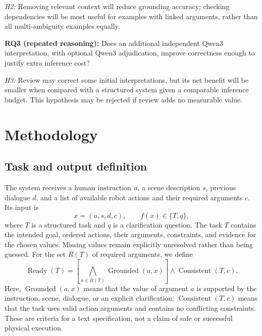 \documentclass[10pt,conference]{IEEEtran}
\begin{document}
\emph{H2:} Removing relevant context will reduce grounding accuracy; checking dependencies will be most useful for examples with linked arguments, rather than all multi-ambiguity examples equally.

\textbf{RQ3 (repeated reasoning):} Does an additional independent Qwen3 interpretation, with optional Qwen3 adjudication, improve correctness enough to justify extra inference cost?

\emph{H3:} Review may correct some initial interpretations, but its net benefit will be smaller when compared with a structured system given a comparable inference budget. This hypothesis may be rejected if review adds no measurable value.

\section{Methodology}
\subsection{Task and output definition}
The system receives a human instruction $u$, a scene description $s$, previous dialogue $d$, and a list of available robot actions and their required arguments $c$. Its input is
\begin{equation}
 x=(u,s,d,c),\qquad f(x)\in\{T,q\},
 \label{eq:task}
\end{equation}
where $T$ is a structured task and $q$ is a clarification question. The task $T$ contains the intended goal, ordered actions, their arguments, constraints, and evidence for the chosen values. Missing values remain explicitly unresolved rather than being guessed. For the set $R(T)$ of required arguments, we define
\begin{equation}
 \operatorname{Ready}(T)=
 \left[\bigwedge_{a\in R(T)}\operatorname{Grounded}(a,x)\right]
 \land\operatorname{Consistent}(T,c).
 \label{eq:ready}
\end{equation}
Here, $\operatorname{Grounded}(a,x)$ means that the value of argument $a$ is supported by the instruction, scene, dialogue, or an explicit clarification; $\operatorname{Consistent}(T,c)$ means that the task uses valid action arguments and contains no conflicting constraints. These are criteria for a text specification, not a claim of safe or successful physical execution.
\end{document}
